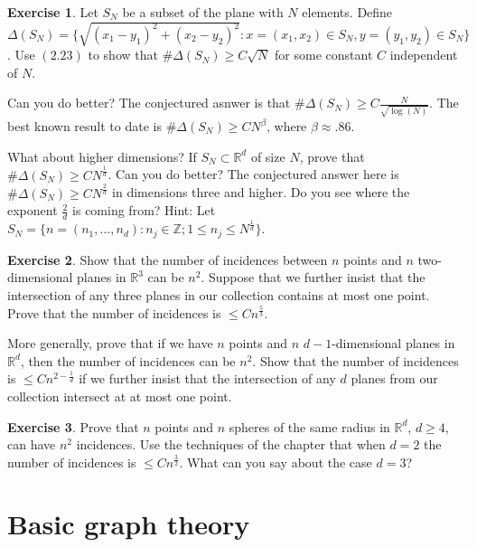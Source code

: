 \documentclass[]{stml-l}
\numberwithin{equation}{chapter}
\theoremstyle{plain}
\theoremstyle{definition}
\newtheorem{exercise}{Exercise}[chapter]
\theoremstyle{remark}
\begin{document}
\begin{exercise} Let $S_N$ be a subset of the plane with $N$
elements. Define $\Delta(S_N)=\{\sqrt{{(x_1-y_1)}^2+{(x_2-y_2)}^2}:
x=(x_1,x_2) \in S_N, y=(y_1,y_2) \in S_N\}$. Use $(2.23)$ to show that
$\# \Delta(S_N) \ge C \sqrt{N}$ for some constant $C$ independent of $N$.

Can you do better? The conjectured asnwer is that $\# \Delta(S_N) \ge
C\frac{N}{\sqrt{\log(N)}}$. The best known result to date is $\#
\Delta(S_N) \ge CN^{\beta}$, where $\beta \approx .86$.

What about higher dimensions? If $S_N \subset {\mathbb R}^d$ of size $N$,
prove that $\# \Delta(S_N) \ge CN^{\frac{1}{d}}$. Can you do better? The
conjectured answer here is $\# \Delta(S_N) \ge CN^{\frac{2}{d}}$ in
dimensions three and higher. Do you see where the exponent $\frac{2}{d}$
is coming from? Hint: Let $S_N=\{n=(n_1, \dots, n_d): n_j \in {\mathbb Z}; 1
\leq n_j \leq N^{\frac{1}{d}} \}$. \end{exercise}

\begin{exercise} Show that the number of incidences between $n$
points and $n$ two-dimensional planes in ${\mathbb R}^3$ can be $n^2$.
Suppose that we further insist that the intersection of any three planes
in our collection contains at most one point. Prove that the number of
incidences is $\leq Cn^{\frac{5}{3}}$.

More generally, prove that if we have $n$ points and $n$
$d-1$-dimensional planes in ${\mathbb R}^d$, then the number of incidences
can be $n^2$. Show that the number of incidences is $\leq
Cn^{2-\frac{1}{d}}$ if we further insist that the intersection of any $d$
planes from our collection intersect at at most one point.
\end{exercise}

\begin{exercise} Prove that $n$ points and $n$ spheres of the
same radius in ${\mathbb R}^d$, $d \ge 4$, can have $n^2$ incidences. Use
the techniques of the chapter that when $d=2$ the number of incidences is
$\leq Cn^{\frac{3}{2}}$. What can you say about the case
$d=3$? \end{exercise}




\chapter{Basic graph theory} \label{graph.append}
\end{document}
